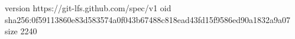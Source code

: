 version https://git-lfs.github.com/spec/v1
oid sha256:0f59113860e83d583574a0f043b67488c818ead43fd15f9586ed90a1832a9a07
size 2240
